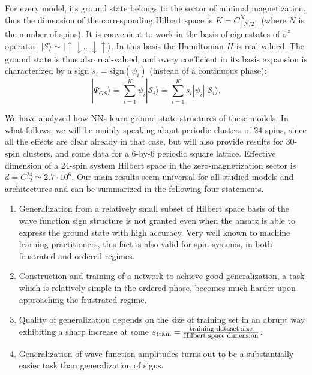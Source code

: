 For every model, its ground state belongs to the sector of minimal magnetization, thus the dimension of the corresponding Hilbert space is $K=C^{N}_{\left[N / 2\right]}$ (where $N$ is the number of spins). It is convenient to work in the basis of eigenstates of $\hat{\sigma}^z$ operator: $|{\mathcal S}\rangle \sim |\uparrow\downarrow\dots\downarrow\uparrow\rangle$. In this basis the Hamiltonian $\hat{H}$ is real-valued. The ground state is thus also real-valued, and every coefficient in its basis expansion is characterized by a sign $s_i=\mbox{sign}(\psi_i)$ (instead of a continuous phase):
\begin{equation}
    |\Psi_{GS}\rangle = \sum\limits_{i=1}^{K} \psi_i|{\mathcal S}_i\rangle = \sum\limits_{i=1}^{K} s_i |\psi_i||{\mathcal S}_i\rangle.
\end{equation}

We have analyzed how NNs learn ground state structures of these models. In what follows, we will be mainly speaking about periodic clusters of 24 spins, since all the effects are clear already in that case, but will also provide results for 30-spin clusters, and some data for a 6-by-6 periodic square lattice. Effective dimension of a 24-spin system Hilbert space in the zero-magnetization sector is $d=C^{24}_{12}\simeq 2.7\cdot 10^6$. Our main results seem universal for all studied models and architectures and can be summarized in the following four statements.

\begin{enumerate}[topsep=0pt, noitemsep]
    \item \label{i:nc20:1} Generalization from a relatively small subset of Hilbert space basis of the wave function sign structure is not granted even when the ansatz is able to express the ground state with high accuracy. Very well known to machine learning practitioners, this fact is also valid for spin systems, in both frustrated and ordered regimes.
    \item \label{i:nc20:2} Construction and training of a network to achieve good generalization, a task which is relatively simple in the ordered phase, becomes much harder upon approaching the frustrated regime.
    \item \label{i:nc20:3} Quality of generalization depends on the size of training set in an abrupt way exhibiting a sharp increase at some $\varepsilon_{\mbox{\footnotesize train}}=\frac{\mbox{\footnotesize training dataset size}}{\mbox{\footnotesize Hilbert space dimension}}$. 
    \item \label{i:nc20:4} Generalization of wave function amplitudes turns out to be a substantially easier task than generalization of signs.
\end{enumerate}


